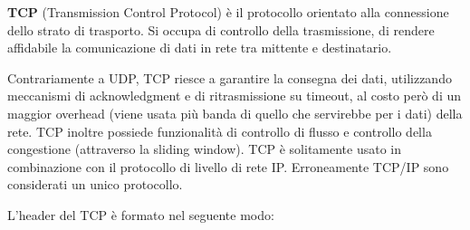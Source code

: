 \textbf{TCP} (Transmission Control Protocol) è il protocollo orientato alla connessione dello strato di trasporto. Si occupa di controllo della trasmissione, di rendere affidabile la comunicazione di dati in rete tra mittente e destinatario.

Contrariamente a UDP, TCP riesce a garantire la consegna dei dati, utilizzando meccanismi di acknowledgment e di ritrasmissione su timeout, al costo però di un maggior overhead (viene usata più banda di quello che servirebbe per i dati) della rete.
TCP inoltre possiede funzionalità di controllo di flusso e controllo della congestione (attraverso la sliding window).
TCP è solitamente usato in combinazione con il protocollo di livello di rete IP. Erroneamente TCP/IP sono considerati un unico protocollo.

L’header del TCP è formato nel seguente modo:
